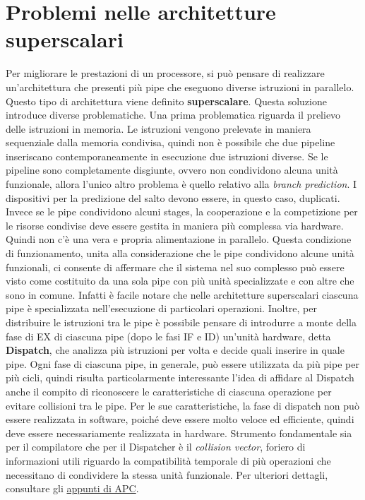\section{Problemi nelle architetture superscalari}
\sloppy
Per migliorare le prestazioni di un processore, si può pensare di realizzare un'architettura che presenti più pipe che eseguono diverse istruzioni in parallelo. Questo tipo di architettura viene definito \textbf{superscalare}.
Questa soluzione introduce diverse problematiche.
Una prima problematica riguarda il prelievo delle istruzioni in memoria. Le istruzioni vengono prelevate in maniera sequenziale dalla memoria condivisa, quindi non è possibile che due pipeline inseriscano contemporaneamente in esecuzione due istruzioni diverse. Se le pipeline sono completamente disgiunte, ovvero non condividono alcuna unità funzionale, allora l'unico altro problema è quello relativo alla \textit{branch prediction}. I dispositivi per la predizione del salto devono essere, in questo caso, duplicati. 
Invece se le pipe condividono alcuni stages, la cooperazione e la competizione per le risorse condivise deve essere gestita in maniera più complessa via hardware. 
Quindi non c'è una vera e propria alimentazione in parallelo. Questa condizione di funzionamento, unita alla considerazione che le pipe condividono alcune unità funzionali, ci consente di affermare che il sistema nel suo complesso può essere visto come costituito da una sola pipe con più unità specializzate e con altre che sono in comune.  
Infatti è facile notare che nelle architetture superscalari ciascuna pipe è specializzata 
nell'esecuzione di particolari operazioni.   
Inoltre, per distribuire le istruzioni tra le pipe è possibile pensare di introdurre a monte della fase di EX di ciascuna pipe (dopo le fasi IF e ID) un'unità hardware, detta \textbf{Dispatch}, che analizza più istruzioni per volta e decide quali inserire in quale pipe. Ogni fase di ciascuna pipe, in generale, può essere utilizzata da più pipe per più cicli, quindi risulta particolarmente interessante l'idea di affidare al Dispatch anche il compito di riconoscere le caratteristiche di ciascuna operazione per evitare collisioni tra le pipe.  
Per le sue caratteristiche, la fase di dispatch non può essere realizzata in software, poiché deve essere molto veloce ed efficiente, quindi deve essere necessariamente realizzata in hardware. Strumento fondamentale sia per il compilatore che per il Dispatcher è il \textit{collision vector}, foriero di informazioni utili riguardo la compatibilità temporale di più operazioni che necessitano di condividere la stessa unità funzionale. Per ulteriori dettagli, consultare gli \href{https://github.com/Agda78/APC-appunti}{appunti di APC}.